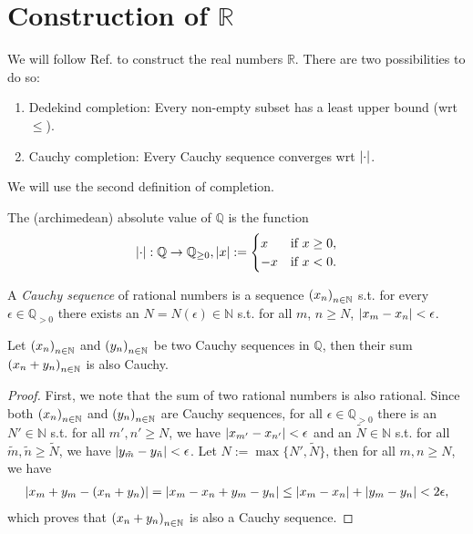 \section{Construction of $\mathbb R$}\label{app:completion_Q}

We will follow Ref. \cite{src:completion_of_Q} to construct the real numbers $\mathbb R$. There are two possibilities to do so:
\begin{enumerate}
	\item Dedekind completion: Every non-empty subset has a least upper bound (wrt $\leq$).
	\item Cauchy completion: Every Cauchy sequence converges wrt $\abs{\cdot}$.
\end{enumerate}

We will use the second definition of completion.

\begin{defn}
	The (archimedean) absolute value of $\mathbb Q$ is the function 
	\begin{align}
		\abs{\cdot}: \mathbb Q\to\mathbb{Q}_{\geq 0}, \abs{x} := \begin{cases}
			x &\text{if}\ x \geq 0,
			\\ -x &\text{if}\ x < 0.
		\end{cases}
	\end{align}
\end{defn}

\begin{defn}
	A \textit{Cauchy sequence} of rational numbers is a sequence $\seq[x_n]$ s.t. for every $\epsilon\in\mathbb{Q}_{> 0}$ there exists an $N = N(\epsilon)\in\mathbb N$ s.t. for all $m$, $n\geq N$, $\abs{x_m - x_n} < \epsilon$.
\end{defn}

\begin{theorem}\label{thrm:sum_Cauchy_sequences_Cauchy}
	Let $\seq[x_n]$ and $\seq[y_n]$ be two Cauchy sequences in $\mathbb Q$, then their sum $\seq[x_n + y_n]$ is also Cauchy.
\end{theorem}

\begin{proof}
	First, we note that the sum of two rational numbers is also rational. Since both $\seq[x_n]$ and $\seq[y_n]$ are Cauchy sequences, for all $\epsilon\in\mathbb Q_{>0}$ there is an $N'\in\mathbb N$ s.t. for all $m', n'\geq N$, we have $\abs{x_{m'} - x_{n'}} < \epsilon$ and an $\tilde{N}\in\mathbb N$ s.t. for all $\tilde{m}, \tilde{n}\geq \tilde{N}$, we have $\abs{y_{\tilde{m}} - y_{\tilde{n}}} < \epsilon$. Let $N := \max\{N', \tilde{N}\}$, then for all $m, n\geq N$, we have
	\begin{align*}
		\abs{x_m + y_m - (x_n + y_n)} = \abs{x_m - x_n + y_m - y_n} \leq \abs{x_m - x_n} + \abs{y_m - y_n} < 2\epsilon,
	\end{align*}
	which proves that $\seq[x_n + y_n]$ is also a Cauchy sequence.
\end{proof}

